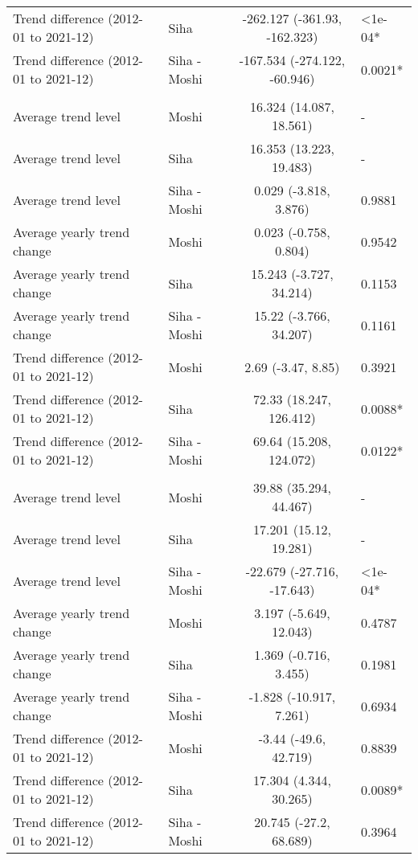 \begin{longtable}{l|lcl}
Trend difference (2012-01 to 2021-12) & Siha & -262.127 (-361.93, -162.323) & <1e-04* \\ 
Trend difference (2012-01 to 2021-12) & Siha - Moshi & -167.534 (-274.122, -60.946) & 0.0021* \\ 
\midrule\addlinespace[2.5pt]
\multicolumn{4}{l}{Neoplasms/Cancer} \\[2.5pt] 
\midrule\addlinespace[2.5pt]
Average trend level & Moshi & 16.324 (14.087, 18.561) & - \\ 
Average trend level & Siha & 16.353 (13.223, 19.483) & - \\ 
Average trend level & Siha - Moshi & 0.029 (-3.818, 3.876) & 0.9881 \\ 
Average yearly trend change & Moshi & 0.023 (-0.758, 0.804) & 0.9542 \\ 
Average yearly trend change & Siha & 15.243 (-3.727, 34.214) & 0.1153 \\ 
Average yearly trend change & Siha - Moshi & 15.22 (-3.766, 34.207) & 0.1161 \\ 
Trend difference (2012-01 to 2021-12) & Moshi & 2.69 (-3.47, 8.85) & 0.3921 \\ 
Trend difference (2012-01 to 2021-12) & Siha & 72.33 (18.247, 126.412) & 0.0088* \\ 
Trend difference (2012-01 to 2021-12) & Siha - Moshi & 69.64 (15.208, 124.072) & 0.0122* \\ 
\midrule\addlinespace[2.5pt]
\multicolumn{4}{l}{Neuroses} \\[2.5pt] 
\midrule\addlinespace[2.5pt]
Average trend level & Moshi & 39.88 (35.294, 44.467) & - \\ 
Average trend level & Siha & 17.201 (15.12, 19.281) & - \\ 
Average trend level & Siha - Moshi & -22.679 (-27.716, -17.643) & <1e-04* \\ 
Average yearly trend change & Moshi & 3.197 (-5.649, 12.043) & 0.4787 \\ 
Average yearly trend change & Siha & 1.369 (-0.716, 3.455) & 0.1981 \\ 
Average yearly trend change & Siha - Moshi & -1.828 (-10.917, 7.261) & 0.6934 \\ 
Trend difference (2012-01 to 2021-12) & Moshi & -3.44 (-49.6, 42.719) & 0.8839 \\ 
Trend difference (2012-01 to 2021-12) & Siha & 17.304 (4.344, 30.265) & 0.0089* \\ 
Trend difference (2012-01 to 2021-12) & Siha - Moshi & 20.745 (-27.2, 68.689) & 0.3964 \\ 

\end{longtable}
